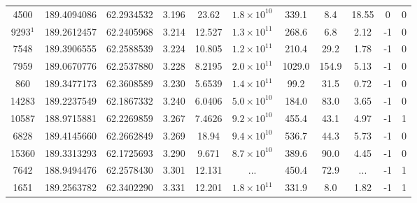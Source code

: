 \begin{table}
\begin{tabular}{ccccccccccc}
       4500 &                  189.4094086 &                 62.2934532 &          3.196 &            23.62 & $1.8\times10^{10}$ &          339.1 &         8.4 &       18.55 &                0 &                  0 \\
   9293$^1$ &                  189.2612457 &                 62.2405968 &          3.214 &           12.527 & $1.3\times10^{11}$ &          268.6 &         6.8 &        2.12 &               -1 &                  0 \\
       7548 &                  189.3906555 &                 62.2588539 &          3.224 &           10.805 & $1.2\times10^{11}$ &          210.4 &        29.2 &        1.78 &               -1 &                  0 \\
       7959 &                  189.0670776 &                 62.2537880 &          3.228 &           8.2195 & $2.0\times10^{11}$ &         1029.0 &       154.9 &        5.13 &               -1 &                  0 \\
        860 &                  189.3477173 &                 62.3608589 &          3.230 &           5.6539 & $1.4\times10^{11}$ &           99.2 &        31.5 &        0.72 &               -1 &                  0 \\
      14283 &                  189.2237549 &                 62.1867332 &          3.240 &           6.0406 & $5.0\times10^{10}$ &          184.0 &        83.0 &        3.65 &               -1 &                  0 \\
      10587 &                  188.9715881 &                 62.2269859 &          3.267 &           7.4626 & $9.2\times10^{10}$ &          455.4 &        43.1 &        4.97 &               -1 &                  1 \\
       6828 &                  189.4145660 &                 62.2662849 &          3.269 &            18.94 & $9.4\times10^{10}$ &          536.7 &        44.3 &        5.73 &               -1 &                  0 \\
      15360 &                  189.3313293 &                 62.1725693 &          3.290 &            9.671 & $8.7\times10^{10}$ &          389.6 &        90.0 &        4.45 &               -1 &                  0 \\
       7642 &                  188.9494476 &                 62.2578430 &          3.301 &           12.131 &                ... &          450.4 &        72.9 &         ... &               -1 &                  1 \\
       1651 &                  189.2563782 &                 62.3402290 &          3.331 &           12.201 & $1.8\times10^{11}$ &          331.9 &         8.0 &        1.82 &               -1 &                  1 \\

\end{tabular}
\end{table}
